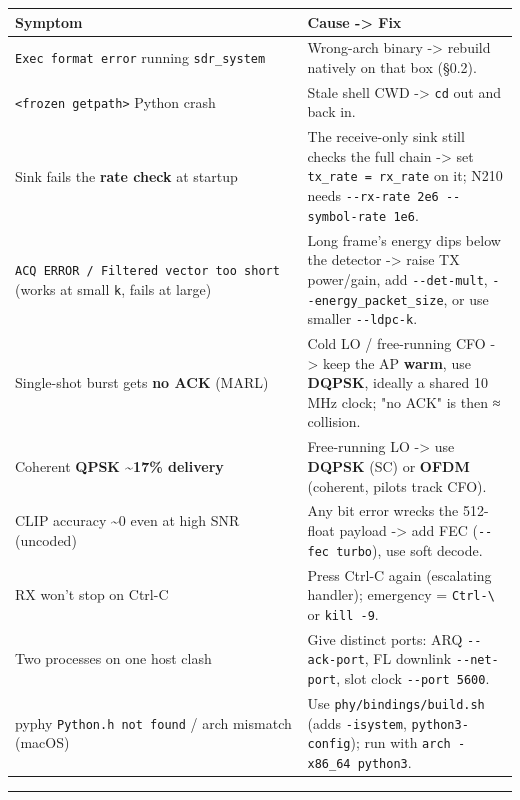 \documentclass[
  9.5pt,
]{article}
\begin{document}
\begin{longtable}[]{@{}ll@{}}
\toprule
Symptom & Cause -\textgreater{} Fix \\
\midrule
\endhead
\texttt{Exec\ format\ error} running \texttt{sdr\_system} & Wrong-arch
binary -\textgreater{} rebuild natively on that box (§0.2). \\
\texttt{\textless{}frozen\ getpath\textgreater{}} Python crash & Stale
shell CWD -\textgreater{} \texttt{cd} out and back in. \\
Sink fails the \textbf{rate check} at startup & The receive-only sink
still checks the full chain -\textgreater{} set
\texttt{tx\_rate\ =\ rx\_rate} on it; N210 needs
\texttt{-\/-rx-rate\ 2e6\ -\/-symbol-rate\ 1e6}. \\
\texttt{ACQ\ ERROR\ /\ Filtered\ vector\ too\ short} (works at small
\texttt{k}, fails at large) & Long frame's energy dips below the
detector -\textgreater{} raise TX power/gain, add \texttt{-\/-det-mult},
\texttt{-\/-energy\_packet\_size}, or use smaller
\texttt{-\/-ldpc-k}. \\
Single-shot burst gets \textbf{no ACK} (MARL) & Cold LO / free-running
CFO -\textgreater{} keep the AP \textbf{warm}, use \textbf{DQPSK},
ideally a shared 10 MHz clock; "no ACK" is then ≈ collision. \\
Coherent \textbf{QPSK \textasciitilde17\% delivery} & Free-running LO
-\textgreater{} use \textbf{DQPSK} (SC) or \textbf{OFDM} (coherent,
pilots track CFO). \\
CLIP accuracy \textasciitilde0 even at high SNR (uncoded) & Any bit
error wrecks the 512-float payload -\textgreater{} add FEC
(\texttt{-\/-fec\ turbo}), use soft decode. \\
RX won't stop on Ctrl-C & Press Ctrl-C again (escalating handler);
emergency = \texttt{Ctrl-\textbackslash{}} or \texttt{kill\ -9}. \\
Two processes on one host clash & Give distinct ports: ARQ
\texttt{-\/-ack-port}, FL downlink \texttt{-\/-net-port}, slot clock
\texttt{-\/-port\ 5600}. \\
pyphy \texttt{Python.h\ not\ found} / arch mismatch (macOS) & Use
\texttt{phy/bindings/build.sh} (adds \texttt{-isystem},
\texttt{python3-config}); run with \texttt{arch\ -x86\_64\ python3}. \\
\bottomrule
\end{longtable}

\begin{center}\rule{0.5\linewidth}{0.5pt}\end{center}
\end{document}
